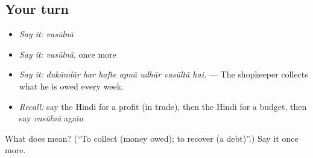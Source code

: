 \subsection*{Your turn}
\begin{itemize}
\raggedright
  \item \emph{Say it:} \emph{vasūlnā}
  \item \emph{Say it:} \emph{vasūlnā}, once more
  \item \emph{Say it:} \emph{dukāndār har hafte apnā udhār vasūltā hai.} — The shopkeeper collects what he is owed every week.
  \item \emph{Recall:} say the Hindi for a profit (in trade), then the Hindi for a budget, then say \emph{vasūlnā} again
\end{itemize}

\begin{tcolorbox}[breakable,colback=teal!4,colframe=teal!35!black,title={Before you move on}]
What does  mean? (\textquotedblleft{}To collect (money owed); to recover (a debt)\textquotedblright{}.) Say it once more.
\end{tcolorbox}
